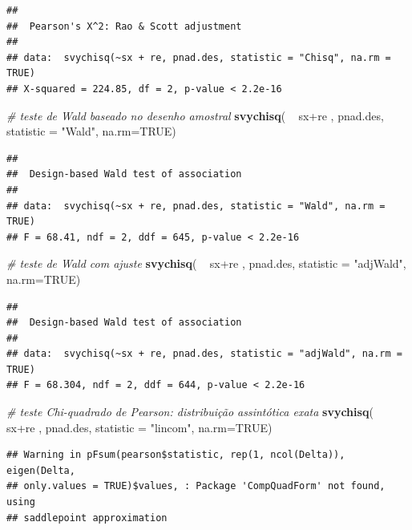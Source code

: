 \documentclass[]{book}
\newenvironment{Shaded}{\begin{snugshade}}{\end{snugshade}}
\newcommand{\KeywordTok}[1]{\textcolor[rgb]{0.13,0.29,0.53}{\textbf{{#1}}}}
\newcommand{\DataTypeTok}[1]{\textcolor[rgb]{0.13,0.29,0.53}{{#1}}}
\newcommand{\StringTok}[1]{\textcolor[rgb]{0.31,0.60,0.02}{{#1}}}
\newcommand{\CommentTok}[1]{\textcolor[rgb]{0.56,0.35,0.01}{\textit{{#1}}}}
\newcommand{\OtherTok}[1]{\textcolor[rgb]{0.56,0.35,0.01}{{#1}}}
\newcommand{\NormalTok}[1]{{#1}}
\numberwithin{example}{chapter}
\numberwithin{remark}{chapter}
\numberwithin{definition}{chapter}
\begin{document}
\begin{verbatim}
## 
##  Pearson's X^2: Rao & Scott adjustment
## 
## data:  svychisq(~sx + re, pnad.des, statistic = "Chisq", na.rm = TRUE)
## X-squared = 224.85, df = 2, p-value < 2.2e-16
\end{verbatim}

\begin{Shaded}
\begin{Highlighting}[]
\CommentTok{# teste de Wald baseado no desenho amostral}
\KeywordTok{svychisq}\NormalTok{( ~}\StringTok{ }\NormalTok{sx+re , pnad.des, }\DataTypeTok{statistic =} \StringTok{"Wald"}\NormalTok{, }\DataTypeTok{na.rm=}\OtherTok{TRUE}\NormalTok{)}
\end{Highlighting}
\end{Shaded}

\begin{verbatim}
## 
##  Design-based Wald test of association
## 
## data:  svychisq(~sx + re, pnad.des, statistic = "Wald", na.rm = TRUE)
## F = 68.41, ndf = 2, ddf = 645, p-value < 2.2e-16
\end{verbatim}

\begin{Shaded}
\begin{Highlighting}[]
\CommentTok{# teste de Wald com ajuste}
\KeywordTok{svychisq}\NormalTok{( ~}\StringTok{ }\NormalTok{sx+re , pnad.des, }\DataTypeTok{statistic =} \StringTok{"adjWald"}\NormalTok{, }\DataTypeTok{na.rm=}\OtherTok{TRUE}\NormalTok{)}
\end{Highlighting}
\end{Shaded}

\begin{verbatim}
## 
##  Design-based Wald test of association
## 
## data:  svychisq(~sx + re, pnad.des, statistic = "adjWald", na.rm = TRUE)
## F = 68.304, ndf = 2, ddf = 644, p-value < 2.2e-16
\end{verbatim}

\begin{Shaded}
\begin{Highlighting}[]
\CommentTok{# teste Chi-quadrado de Pearson: distribuição assintótica exata}
\KeywordTok{svychisq}\NormalTok{( ~}\StringTok{ }\NormalTok{sx+re , pnad.des, }\DataTypeTok{statistic =} \StringTok{"lincom"}\NormalTok{, }\DataTypeTok{na.rm=}\OtherTok{TRUE}\NormalTok{)}
\end{Highlighting}
\end{Shaded}

\begin{verbatim}
## Warning in pFsum(pearson$statistic, rep(1, ncol(Delta)), eigen(Delta,
## only.values = TRUE)$values, : Package 'CompQuadForm' not found, using
## saddlepoint approximation
\end{verbatim}
\end{document}
